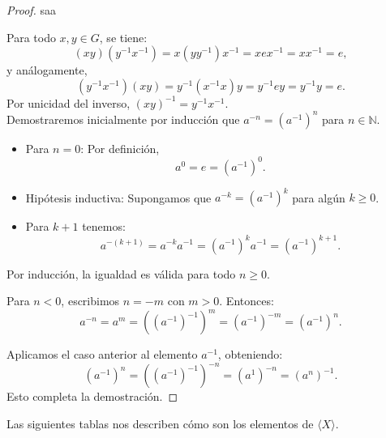 \begin{proof}
	{\color{white}saa}
	
	\medskip
	\noindent [$1$] Para todo \( x, y \in G \), se tiene:
	\[
	(xy)(y^{-1}x^{-1}) = x(yy^{-1})x^{-1} = xex^{-1} = xx^{-1} = e,
	\]
	y análogamente,
	\[
	(y^{-1}x^{-1})(xy) = y^{-1}(x^{-1}x)y = y^{-1}ey = y^{-1}y = e.
	\]
	Por unicidad del inverso, \( (xy)^{-1} = y^{-1}x^{-1} \).\\
	
	\noindent [$2$] Demostraremos inicialmente por inducción que \( a^{-n} = (a^{-1})^n \) para  \( n \in \mathbb{N}\).
	\begin{itemize}
		\item  Para \( n = 0 \): Por definición,
		\[
		a^0 = e = (a^{-1})^0.
		\]
		\item  Hipótesis inductiva: Supongamos que \( a^{-k} = (a^{-1})^k \) para algún \( k \geq 0 \).
		\item Para $k+1$ tenemos:
		\[
		a^{-(k+1)} = a^{-k} a^{-1} = (a^{-1})^k a^{-1} = (a^{-1})^{k+1}.
		\]
	\end{itemize}
	\noindent Por inducción, la igualdad es válida para todo \( n \geq 0 \).
	
	\medskip
	\noindent Para \( n < 0 \), escribimos \( n = -m \) con \( m > 0 \). Entonces:
	\[
	a^{-n} = a^m = \left((a^{-1})^{-1}\right)^m = (a^{-1})^{-m} = (a^{-1})^n.
	\]
	
	\medskip
	\noindent [$3$] Aplicamos el caso anterior al elemento \( a^{-1} \), obteniendo:
	\[
	(a^{-1})^n = ((a^{-1})^{-1})^{-n} = (a^1)^{-n} = (a^n)^{-1}.
	\]
	Esto completa la demostración.
\end{proof}

\vspace{0.8cm}
Las siguientes tablas nos describen cómo son los elementos de $\langle X \rangle$.\\


\begin{table}[H]
	\centering
	{\large
		\renewcommand{\arraystretch}{0.8}
	}
	\caption{Descripción de \(\langle X \rangle\) con notación multiplicativa}
\end{table}

